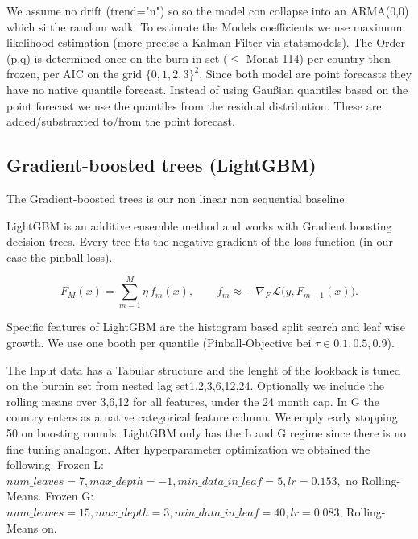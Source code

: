 We assume no drift (trend="n") so so the model con collapse into an ARMA(0,0) which si the random walk. To estimate the Models coefficients we use maximum likelihood estimation (more precise a Kalman Filter via statsmodels). The Order (p,q) is determined once on the burn in set ($\le$ Monat 114) per country then frozen, per AIC on the grid $\{0,1,2,3\}^2$. Since both model are point forecasts they have no native quantile forecast. Instead of using Gaußian quantiles based on the point forecast we use the quantiles from the residual distribution. These are added/substraxted to/from the point forecast. 





\subsection{Gradient-boosted trees (LightGBM)}

\label{sec:models:lgbm}

The Gradient-boosted trees is our non linear non sequential baseline.

LightGBM is an additive ensemble method and works with Gradient boosting decision trees. Every tree fits the negative gradient of the loss function (in our case the pinball loss).

\begin{equation}

  F_M(x)=\sum_{m=1}^{M}\eta\,f_m(x),

  \qquad

  f_m\approx-\,\nabla_{\!F}\,\mathcal{L}\big(y,F_{m-1}(x)\big).

  \label{eq:gbdt}

\end{equation}

Specific features of LightGBM are the histogram based split search and leaf wise growth. We use one booth per quantile (Pinball-Objective bei $\tau\in{0.1,0.5,0.9}$).

The Input data has a Tabular structure and the lenght of the lookback is tuned on the burnin set from nested lag set{1,2,3,6,12,24}. Optionally we include the rolling means over {3,6,12} for all features, under the 24 month cap. In G the country enters as a native categorical feature column. We emply early stopping 50 on boosting rounds. LightGBM only has the L and G regime since there is no fine tuning analogon. After hyperparameter optimization we obtained the following. Frozen L: $num\_leaves=7, max\_depth=-1, min\_data\_in\_leaf=5, lr=0.153,$ no Rolling-Means. Frozen G: $num\_leaves=15, max\_depth=3, min\_data\_in\_leaf=40, lr=0.083$, Rolling-Means on.

